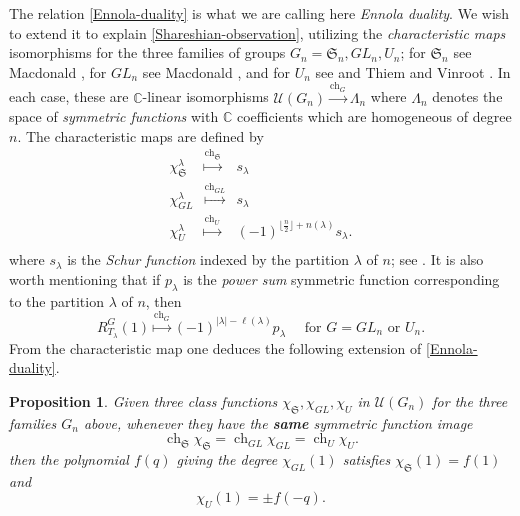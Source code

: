 \documentclass[10pt]{amsart}
\theoremstyle{plain}
\newtheorem{proposition}[theorem]{Proposition}
\theoremstyle{definition}
\theoremstyle{remark}
\numberwithin{equation}{section}
\newcommand\ch{\operatorname{ch}}
\newcommand\CC{\mathbb{C}}
\newcommand\UUU{\mathcal{U}}
\newcommand\symm{\mathfrak{S}}
\begin{document}
The relation \eqref{Ennola-duality} is what we are calling here
{\it Ennola duality}.  We wish to extend it to 
explain \eqref{Shareshian-observation},
utilizing the {\it characteristic maps} isomorphisms
for the three families of groups $G_n=\symm_n, GL_n, U_n$;
for $\symm_n$ see Macdonald \cite[Chap I \S 7]{Macdonald},
for $GL_n$ see Macdonald \cite[Chap IV \S 4]{Macdonald},
and for $U_n$ see and Thiem and Vinroot \cite[\S 4]{ThiemVinroot}.
In each case, these are $\CC$-linear isomorphisms 
$
\UUU(G_n) \overset{\ch_G}{\longrightarrow} \Lambda_n
$ 
where $\Lambda_n$ denotes the space of  
{\it symmetric functions} with $\CC$ coefficients 
which are homogeneous of degree $n$.
The characteristic maps are defined by
$$
\begin{array}{rcl}
 \chi_\symm^\lambda &  \overset{\ch_\symm}{\longmapsto} & s_\lambda \\
\chi_{GL}^\lambda &  \overset{\ch_{GL}}{\longmapsto} & s_\lambda \\
\chi_U^\lambda &  \overset{\ch_{U}}{\longmapsto} & (-1)^{\lfloor \frac{n}{2}\rfloor+n(\lambda)} 
                               s_\lambda. \\
\end{array}
$$
where $s_\lambda$ is the {\it Schur function} indexed by the
partition $\lambda$ of $n$; see \cite[Chap. I \S 3]{Macdonald}. 
It is also worth mentioning that if $p_\lambda$ 
is the {\it power sum} symmetric function corresponding to the partition $\lambda$ of $n$, 
then
$$
R_{T_\lambda}^{G}(1) 
\overset{\ch_{G}}{\longmapsto}
(-1)^{|\lambda|-\ell(\lambda)} p_\lambda \quad \text{ for }G=GL_n\text{ or }U_n. 
$$
From the characteristic map one deduces the 
following extension of \eqref{Ennola-duality}.
\begin{proposition}
\label{extended-Ennola-duality}
Given three class functions $\chi_\symm, \chi_{GL}, \chi_U$
in $\UUU(G_n)$ for the three families $G_n$ above,
whenever they have the {\bf same} symmetric function image 
$$
 \ch_\symm \chi_\symm =  \ch_{GL} \chi_{GL} = \ch_U \chi_U.
$$
then the polynomial $f(q)$ giving 
the degree $\chi_{GL}(1)$ satisfies $\chi_\symm(1) = f(1)$ and
$$
\chi_U(1) = \pm f(-q).
$$
\end{proposition}
\end{document}
